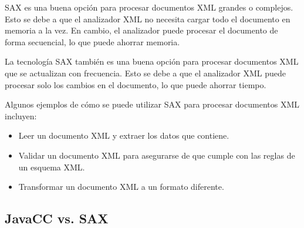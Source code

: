 SAX es una buena opción para procesar documentos XML grandes o complejos. Esto se debe a que el analizador XML no necesita cargar todo el documento en memoria a la vez. En cambio, el analizador puede procesar el documento de forma secuencial, lo que puede ahorrar memoria.

La tecnología SAX también es una buena opción para procesar documentos XML que se actualizan con frecuencia. Esto se debe a que el analizador XML puede procesar solo los cambios en el documento, lo que puede ahorrar tiempo.

Algunos ejemplos de cómo se puede utilizar SAX para procesar documentos XML incluyen:
\begin{itemize}
    \item Leer un documento XML y extraer los datos que contiene.
    \item Validar un documento XML para asegurarse de que cumple con las reglas de un esquema XML.
    \item Transformar un documento XML a un formato diferente.
\end{itemize}

\subsection{JavaCC vs. SAX}

